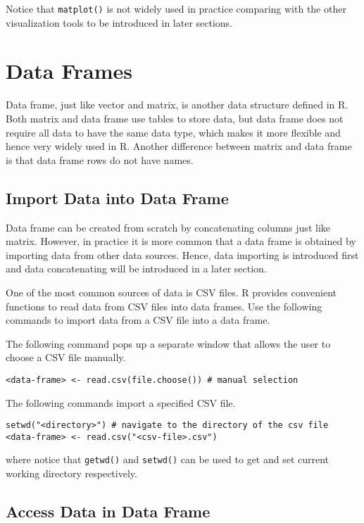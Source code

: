 Notice that \verb|matplot()| is not widely used in practice comparing with the other visualization tools to be introduced in later sections.

\section{Data Frames} \label{ch:r1:sec:df}

Data frame, just like vector and matrix, is another data structure defined in R. Both matrix and data frame use tables to store data, but data frame does not require all data to have the same data type, which makes it more flexible and hence very widely used in R. Another difference between matrix and data frame is that data frame rows do not have names.

\subsection{Import Data into Data Frame}

Data frame can be created from scratch by concatenating columns just like matrix. However, in practice it is more common that a data frame is obtained by importing data from other data sources. Hence, data importing is introduced first and data concatenating will be introduced in a later section.

One of the most common sources of data is CSV files. R provides convenient functions to read data from CSV files into data frames. Use the following commands to import data from a CSV file into a data frame.

The following command pops up a separate window that allows the user to choose a CSV file manually.
\begin{lstlisting}
<data-frame> <- read.csv(file.choose()) # manual selection
\end{lstlisting}
The following commands import a specified CSV file.
\begin{lstlisting}
setwd("<directory>") # navigate to the directory of the csv file
<data-frame> <- read.csv("<csv-file>.csv")
\end{lstlisting}
where notice that \verb|getwd()| and \verb|setwd()| can be used to get and set current working directory respectively.

\subsection{Access Data in Data Frame}

